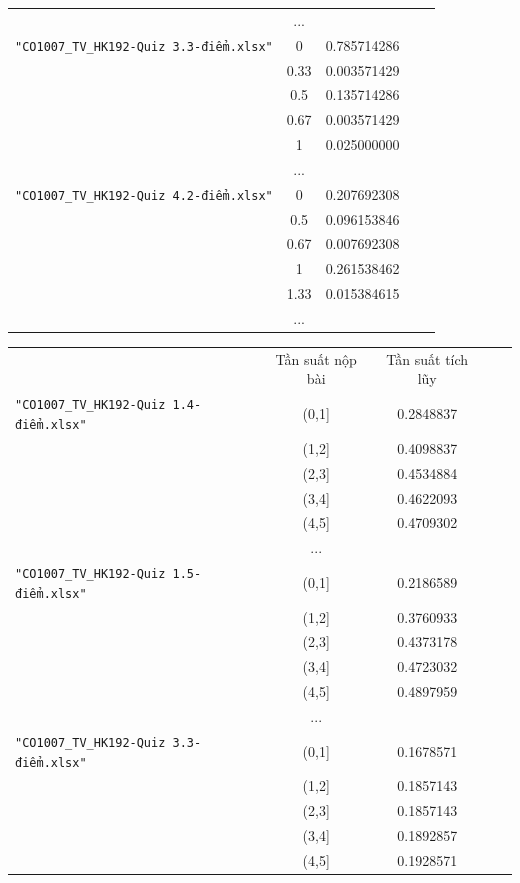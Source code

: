 \documentclass[a4paper]{article}
\theoremstyle{definition}
\begin{document}
\begin{enumerate}[a)]
\begin{itemize}
\begin{itemize}
\begin{center}
\begin{tabular}{l c c c c}
                     & ...\\
                     \texttt{"CO1007\_TV\_HK192-Quiz 3.3-điểm.xlsx"} & 0 & 0.785714286 \\ & 0.33 & 0.003571429 \\ & 0.5 & 0.135714286 \\ & 0.67 & 0.003571429 \\ & 1 & 0.025000000\\
                     & ...\\
                     \texttt{"CO1007\_TV\_HK192-Quiz 4.2-điểm.xlsx"} & 0 & 0.207692308 \\ & 0.5 & 0.096153846 \\ & 0.67 & 0.007692308 \\ & 1 & 0.261538462 \\ & 1.33 & 0.015384615\\
                     & ...
                \end{tabular}
            \end{center}
            \begin{center}
                \begin{tabular}{l c c c c}
                     & Tần suất nộp bài & Tần suất tích lũy\\
                     \texttt{"CO1007\_TV\_HK192-Quiz 1.4-điểm.xlsx"} & (0,1] & 0.2848837 \\ & (1,2] & 0.4098837 \\ & (2,3] & 0.4534884 \\ & (3,4] & 0.4622093 \\ & (4,5] & 0.4709302\\
                     & ...\\
                     \texttt{"CO1007\_TV\_HK192-Quiz 1.5-điểm.xlsx"} & (0,1] & 0.2186589 \\ & (1,2] & 0.3760933 \\ & (2,3] & 0.4373178 \\ & (3,4] & 0.4723032 \\ & (4,5] & 0.4897959\\
                     & ...\\
                     \texttt{"CO1007\_TV\_HK192-Quiz 3.3-điểm.xlsx"} & (0,1] & 0.1678571 \\ & (1,2] & 0.1857143 \\ & (2,3] & 0.1857143 \\ & (3,4] & 0.1892857 \\ & (4,5] & 0.1928571\\

\end{tabular}
\end{center}
\end{itemize}
\end{itemize}
\end{enumerate}
\end{document}
